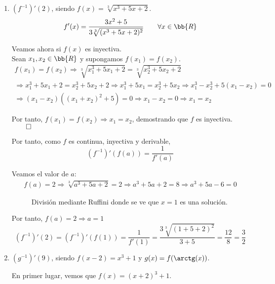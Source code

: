 \begin{ejercicio}
\begin{enumerate}
        \item $(f^{-1})'(2)$, siendo $f(x)=\sqrt[3]{x^3+5x+2}$.
        $$f'(x) = \frac{3x^2+5}{3 \sqrt[3]{(x^3+5x+2)^2}} \qquad \forall x \in \bb{R}$$

        Veamos ahora si $f(x)$ es inyectiva.\\Sean $x_1, x_2 \in \bb{R}$ y supongamos $f(x_1)=f(x_2)$.
        \begin{multline*}
            f(x_1)=f(x_2) \Longrightarrow \sqrt[3]{x_1^3+5x_1+2} = \sqrt[3]{x_2^3+5x_2+2} \\
            \Longrightarrow x_1^3+5x_1+2 = x_2^3+5x_2 +2 \Longrightarrow x_1^3+5x_1 = x_2^3+5x_2 \Longrightarrow x_1^3-x_2^3 + 5(x_1-x_2)=0 \\
            \Longrightarrow (x_1-x_2)((x_1+x_2)^2 + 5)=0 \Longrightarrow x_1-x_2=0 \Longrightarrow x_1=x_2
        \end{multline*}

        Por tanto, $f(x_1)=f(x_2)\Longrightarrow x_1=x_2$, demostrando que $f$ es inyectiva. $\hfill \qed$

        Por tanto, como $f$ es continua, inyectiva y derivable,
        \begin{equation*}
            (f^{-1})'(f(a)) = \frac{1}{f'(a)}
        \end{equation*}

        Veamos el valor de $a$:
        \begin{multline*}
            f(a)=2 \Longrightarrow \sqrt[3]{a^3+5a+2} = 2 \Longrightarrow a^3+5a+2 = 8 \Longrightarrow a^3+5a-6=0
        \end{multline*}
        
        \begin{figure}[H]
            \centering
            \caption{División mediante Ruffini donde se ve que $x=1$ es una solución.}
            \label{Fig:DivRuffini6.3}
        \end{figure}
        Por tanto, $f(a)=2 \Longrightarrow a=1$
        \begin{equation*}
            (f^{-1})'(2) = (f^{-1})'(f(1)) = \frac{1}{f'(1)} = \frac{3\sqrt[3]{(1+5+2)^2}}{3+5} = \frac{12}{8}=\frac{3}{2}
        \end{equation*}

        \item $(g^{-1})'(9)$, siendo $f(x-2)=x^3+1$ y $g(x)=f(\arctg(x))$.

        En primer lugar, vemos que $f(x)=(x+2)^3 +1$.
        

\end{enumerate}
\end{ejercicio}
